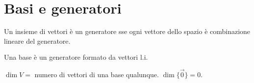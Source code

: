\section{Basi e generatori}
Un insieme di vettori è un generatore sse ogni vettore dello spazio è combinazione lineare del generatore.

Una base è un generatore formato da vettori l.i.

$\dim V = $ numero di vettori di una base qualunque.
$\dim \{\vec{0}\} = 0$.